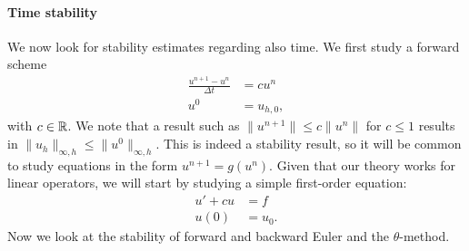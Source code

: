 \paragraph{Time stability}
We now look for stability estimates regarding also time. We first study a forward scheme 
\begin{equation}
    \begin{aligned}
        \displaystyle\frac{u^{n+1}-u^n}{\Delta t} &= cu^n\\
        u^0&= u_{h,0},
    \end{aligned}
\end{equation}
with $c\in \mathbb{R}$. We note that a result such as $\|u^{n+1}\|\leq c\|u^n\|$ for $c\leq 1$ results in $\|u_h\|_{\infty, h} \leq \|u^0\|_{\infty, h}$. This is indeed a stability result, so it will be common to study equations in the form $u^{n+1} = g(u^n)$. Given that our theory works for linear operators, we will start by studying a simple first-order equation:
\begin{equation}
    \begin{aligned}
        u'+cu &= f\\
        u(0) &= u_0.
    \end{aligned}
\end{equation}
Now we look at the stability of forward and backward Euler and the $\theta$-method. 
